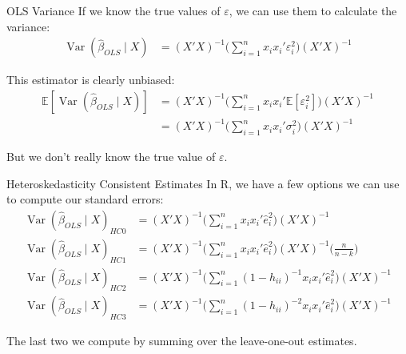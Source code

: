 \begin{frame}{OLS Variance}
    If we know the true values of $\varepsilon$, we can use them to calculate the variance:
    \begin{align*}
        \operatorname{Var}(\hat{\beta}_{OLS} \mid X) &= (X'X)^{-1} \Biggr( \sum_{i=1}^n x_i x_i' \varepsilon_i^2 \Biggr) (X'X)^{-1}
    \end{align*}

    This estimator is clearly unbiased:
    \begin{align*}
        \mathbb{E}[\operatorname{Var}(\hat{\beta}_{OLS} \mid X)] &= (X'X)^{-1} \Biggr( \sum_{i=1}^n x_i x_i' \mathbb{E}[\varepsilon_i^2] \Biggr) (X'X)^{-1}
        \\
        &= (X'X)^{-1} \Biggr( \sum_{i=1}^n x_i x_i' \sigma_i^2 \Biggr) (X'X)^{-1}
    \end{align*}

    But we don't really know the true value of $\varepsilon$.
    
\end{frame}

\begin{frame}{Heteroskedasticity Consistent Estimates}
    In R, we have a few options we can use to compute our standard errors:
    \begin{align*}
        \operatorname{Var}(\hat{\beta}_{OLS} \mid X)_{HC0} &= (X'X)^{-1} \Biggr( \sum_{i=1}^n x_i x_i' \hat{e}_i^2 \Biggr) (X'X)^{-1}
        \\
        \operatorname{Var}(\hat{\beta}_{OLS} \mid X)_{HC1} &= (X'X)^{-1} \Biggr( \sum_{i=1}^n x_i x_i' \hat{e}_i^2 \Biggr) (X'X)^{-1} \Biggr( \frac{n}{n-k} \Biggr)
        \\
        \operatorname{Var}(\hat{\beta}_{OLS} \mid X)_{HC2} &= (X'X)^{-1} \Biggr( \sum_{i=1}^n (1 - h_{ii})^{-1} x_i x_i' \hat{e}_i^2 \Biggr) (X'X)^{-1}
        \\
        \operatorname{Var}(\hat{\beta}_{OLS} \mid X)_{HC3} &= (X'X)^{-1} \Biggr( \sum_{i=1}^n (1 - h_{ii})^{-2} x_i x_i' \hat{e}_i^2 \Biggr) (X'X)^{-1}
    \end{align*}

    The last two we compute by summing over the leave-one-out estimates.
    
\end{frame}